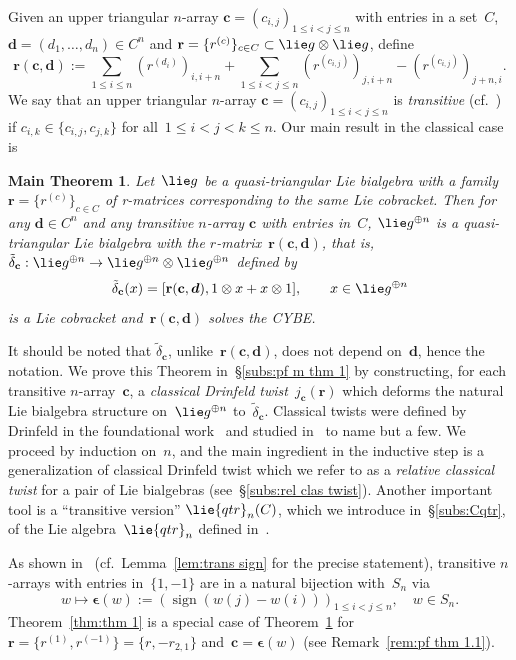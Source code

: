\documentclass[12pt, reqno]{amsart}
\newtheorem{mthm}[theorem]{Main Theorem}
\theoremstyle{definition}
\numberwithin{equation}{section}
\newcommand{\tensor}{\otimes}
\DeclareMathOperator{\sign}{sign}
\newcommand{\sgna}[1]{\boldsymbol{\epsilon}(#1)}
\begin{document}
Given an upper triangular $n$-array $\mathbf c=(c_{i,j})_{1\le i<j\le n}$ with entries in a set~$C$,
$\boldsymbol d=(d_1,\dots,d_n)\in C^n$ and $\mathbf r=\{r^{(c)}\}_{c\in C}\subset 
\lie g\tensor \lie g$, define
\begin{equation}\label{eq:r c d}
\mathbf r(\mathbf c,\boldsymbol d):=\sum_{1\le i\le n}(r^{(d_{i})})_{i,i+n}
+\sum_{1\le i<j\le n} (r^{(c_{i,j})})_{j,i+n}-(r^{(c_{i,j})})_{j+n,i}.
\end{equation}
We say that an upper triangular $n$-array $\mathbf c=(c_{i,j})_{1\le i<j\le n}$ is {\em transitive} (cf.~\cites{ABGJ,ABGJepr}) 
if $c_{i,k}\in\{c_{i,j},c_{j,k}\}$ for all~$1\le i<j<k\le n$. Our main result in the classical case is
\begin{mthm}\label{thm:main thm trans}
Let~$\lie g$ be a quasi-triangular Lie bialgebra with a family~$\mathbf r=\{r^{(c)}\}_{c\in C}$ of r-matrices corresponding to the same Lie cobracket.
Then for 
any $\boldsymbol d\in C^n$ and
any transitive $n$-array $\mathbf c$ with entries in~$C$,
$\lie g^{\oplus n}$ is a quasi-triangular Lie bialgebra with the $r$-matrix~$\mathbf r(\mathbf c,
\boldsymbol d)$, that is,
$\tilde\delta_{\mathbf c}:\lie g^{\oplus n}\to \lie g^{\oplus n}\tensor \lie g^{\oplus n}$ defined by 
$$\tilde\delta_{\mathbf c}(x)=[\mathbf r(\mathbf c,\boldsymbol{d}),
1\tensor x+x\tensor 1],\qquad x\in\lie g^{\oplus n}
$$
is a Lie cobracket and~$\mathbf r(\mathbf c,\boldsymbol d)$ solves the CYBE.
\end{mthm}
It should be noted that $\tilde\delta_{\mathbf c}$,
unlike~$\mathbf r(\mathbf c,\boldsymbol d)$, does not 
depend on~$\boldsymbol{d}$, hence the notation.
We prove this Theorem in~\S\ref{subs:pf m thm 1} by constructing, for each transitive
$n$-array~$\mathbf c$, a {\em classical Drinfeld twist}~$j_{\mathbf c}(\mathbf r)$ which deforms the natural Lie bialgebra structure 
on~$\lie g^{\oplus n}$ to~$\tilde\delta_{\mathbf c}$. Classical twists were defined by
Drinfeld in the foundational work~\cite{Drinf} and studied in~\cites{AM,EH,Halb,KPSST,LuMou}
to name but a few. We proceed by induction on~$n$,
and the main ingredient in the inductive step is 
a generalization of classical Drinfeld twist which
we refer to as a {\em relative classical twist} for a pair
of Lie bialgebras (see~\S\ref{subs:rel clas twist}).
Another important tool is 
a ``transitive version'' $\lie{qtr}_n(C)$, which we introduce in~\S\ref{subs:Cqtr}, of the Lie algebra~$\lie{qtr}_n$ defined in~\cite{BEER}. 

As shown in~\cite{ABGJ} (cf.~Lemma~\ref{lem:trans sign} for the precise statement), transitive $n$-arrays 
with entries in~$\{1,-1\}$
are 
in a natural bijection with~$S_n$
via 
\begin{equation}\label{eq:sgna defn}w\mapsto\sgna{w}:=(\sign(w(j)-w(i)))_{1\le i<j\le n},\quad w\in S_n.
\end{equation}
Theorem~\ref{thm:thm 1} is a special case of
Theorem~\ref{thm:main thm trans} for~$\mathbf r=\{r^{(1)},r^{(-1)}\}=\{r,-r_{2,1}\}$ and~$\mathbf c=\boldsymbol{\epsilon}(w)$ (see Remark~\ref{rem:pf thm 1.1}). 
\end{document}
